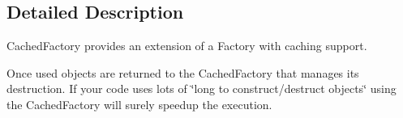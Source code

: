 \subsection{Detailed Description}
Cached\+Factory provides an extension of a Factory with caching support. 

Once used objects are returned to the Cached\+Factory that manages its destruction. If your code uses lots of \char`\"{}long to construct/destruct objects\char`\"{} using the Cached\+Factory will surely speedup the execution. 